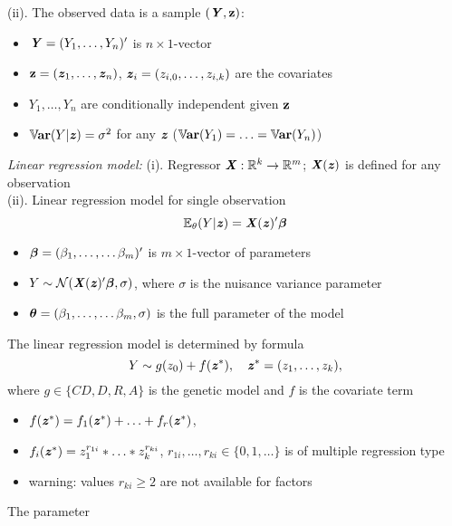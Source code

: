 \documentclass[11pt]{article}
\begin{document}
\noindent
(ii). The observed data is a sample $(\mbox{\textbf{\textit Y}},\mbox{\bf z})$:\vspace{-2mm}
\begin{itemize}
\setlength\itemsep{-0.5em}
\item[]
$\mbox{\textbf{\textit Y}}=(Y_1,\ldots,Y_n)'$ is $n\times 1$-vector
\item[]
$\mbox{\bf z}=(\mbox{\textbf{\textit z}}_1,\ldots,\mbox{\textbf{\textit z}}_n)$, $\mbox{\textbf{\textit z}}_{i}=(z_{i,0},\ldots,z_{i,k})$  are the covariates
\item[]
$Y_1,\ldots,Y_n$ are conditionally independent given $\mbox{\bf z}$
\item[]
${\mathbb V}\hspace{-0.2ex}\mbox{\bf ar}(Y|\mbox{\textbf{\textit z}})=\sigma^2$ for any $\mbox{\textbf{\textit z}}$ (${\mathbb V}\hspace{-0.2ex}\mbox{\bf ar}(Y_1)=\ldots ={\mathbb V}\hspace{-0.2ex}\mbox{\bf ar}(Y_n)$)
\end{itemize}
\noindent
{\it Linear regression model:} (i). Regressor $\mbox{\textbf{\textit X}}:{\mathbb R}^k\to{\mathbb R}^m$; $\mbox{\textbf{\textit X}}(\mbox{\textbf{\textit z}})$ is defined for any observation \\
(ii). Linear regression model for single observation 
$$
\E_{\theta}(Y|\zbi)=\Xbi(\zbi)'\betab
\vspace{-3mm}
$$
\begin{itemize}
\setlength\itemsep{-0.3em}
\item[]
${\boldsymbol \beta}=(\beta_1,\ldots,\ldots\beta_m)'$ is $m\times 1$-vector of parameters
\item[]
$Y\sim {\cal N}(\mbox{\textbf{\textit X}}(\mbox{\textbf{\textit z}})'{\boldsymbol \beta},\sigma)$, where $\sigma$ is the nuisance variance parameter 
\item[]
${\boldsymbol \theta}=(\beta_1,\ldots,\ldots\beta_m,\sigma)$ is the full parameter of the model
\end{itemize}
The linear regression model is determined by formula 
$$
Y\sim g(z_0)+f(\zbi^*),\quad \zbi^*=(z_1,\ldots,z_k),
\vspace{-2mm}
$$
where $g\in \{CD,D,R,A\}$ is the genetic model and $f$ is the covariate term
\vspace{-2mm}
\begin{itemize}
\setlength\itemsep{-0.3em}
\item[]
$f(\mbox{\textbf{\textit z}}^*)=f_1(\mbox{\textbf{\textit z}}^*)+\ldots+f_r(\mbox{\textbf{\textit z}}^*)$, 
\item[]
$f_i(\mbox{\textbf{\textit z}}^*)=z_1^{r_{1i}}*\ldots*z_k^{r_{ki}}$, $r_{1i},\ldots,r_{ki}\in\{0,1,\ldots\}$ is of multiple regression type 
\item[]
warning: values $r_{ki}\geq 2$ are not available for factors
\end{itemize}
The parameter\vspace{-2mm}
\end{document}
